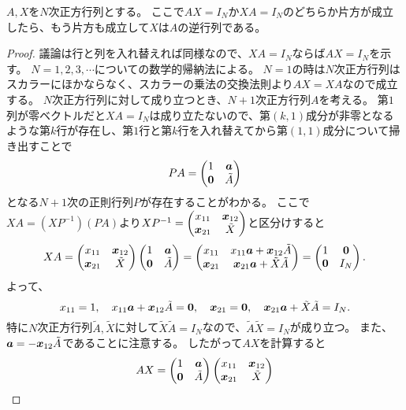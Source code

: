 \begin{theorem}[逆行列の同値な条件]
$A, X$を$N$次正方行列とする。
ここで$A X = I_N$か$X A = I_N$のどちらか片方が成立したら、もう片方も成立して$X$は$A$の逆行列である。
\end{theorem}

\begin{proof}
議論は行と列を入れ替えれば同様なので、$X A = I_N$ならば$A X = I_N$を示す。
$N = 1, 2, 3, \cdots$についての数学的帰納法による。
$N = 1$の時は$N$次正方行列はスカラーにほかならなく、スカラーの乗法の交換法則より$A X = X A$なので成立する。
$N$次正方行列に対して成り立つとき、$N+1$次正方行列$A$を考える。
第$1$列が零ベクトルだと$X A = I_N$は成り立たないので、第$(k, 1)$成分が非零となるような第$k$行が存在し、第$1$行と第$k$行を入れ替えてから第$(1, 1)$成分について掃き出すことで
$$
P A = \begin{pmatrix}1 & \vb*{a} \\ \vb*{0} & \tilde{A}\end{pmatrix}
$$
となる$N+1$次の正則行列$P$が存在することがわかる。
ここで$X A = (X P^{-1})(P A)$より$X P^{-1} = \begin{pmatrix}x_{1 1} & \vb*{x}_{1 2} \\ \vb*{x}_{2 1} & \tilde{X}\end{pmatrix}$と区分けすると
$$
X A
= \begin{pmatrix}x_{1 1} & \vb*{x}_{1 2} \\ \vb*{x}_{2 1} & \tilde{X}\end{pmatrix}\begin{pmatrix}1 & \vb*{a} \\ \vb*{0} & \tilde{A}\end{pmatrix}
= \begin{pmatrix}x_{1 1} & x_{1 1}\vb*{a}+\vb*{x}_{1 2}\tilde{A} \\ \vb*{x}_{2 1} & \vb*{x}_{2 1}\vb*{a}+\tilde{X}\tilde{A}\end{pmatrix}
= \begin{pmatrix}1 & \vb*{0} \\ \vb*{0} & I_N\end{pmatrix}.
$$
よって、
$$
x_{1 1} = 1,
\quad x_{1 1}\vb*{a}+\vb*{x}_{1 2}\tilde{A} = \vb*{0},
\quad \vb*{x}_{2 1} = \vb*{0},
\quad \vb*{x}_{2 1}\vb*{a}+\tilde{X}\tilde{A} = I_N.
$$
特に$N$次正方行列$\tilde{A}, \tilde{X}$に対して$\tilde{X}\tilde{A} = I_N$なので、$\tilde{A}\tilde{X} = I_N$が成り立つ。
また、$\vb*{a} = -\vb*{x}_{1 2}\tilde{A}$であることに注意する。
したがって$A X$を計算すると
$$
A X
= \begin{pmatrix}1 & \vb*{a} \\ \vb*{0} & \tilde{A}\end{pmatrix}\begin{pmatrix}x_{1 1} & \vb*{x}_{1 2} \\ \vb*{x}_{2 1} & \tilde{X}\end{pmatrix}
$$
\end{proof}
